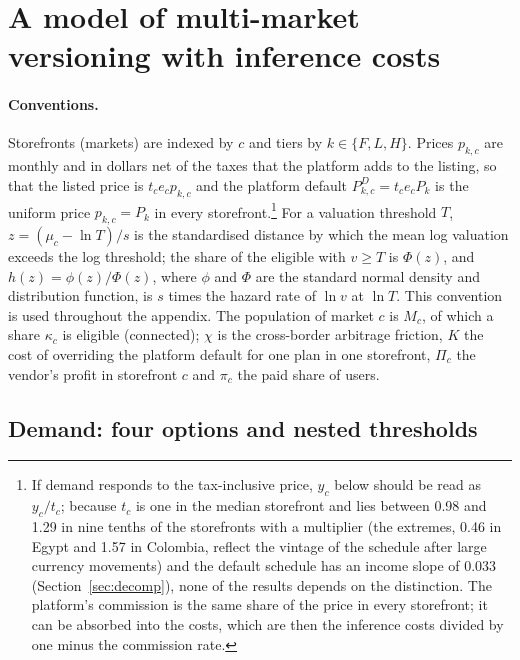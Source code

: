 \documentclass[11pt]{article}
\theoremstyle{definition}
\theoremstyle{remark}
\begin{document}
\section{A model of multi-market versioning with inference costs}\label{app:tiermodel}
\label{sec:conditional_access}

\paragraph{Conventions.} Storefronts (markets) are indexed by $c$ and tiers by $k\in\{F,L,H\}$. Prices $p_{k,c}$ are monthly and in dollars net of the taxes that the platform adds to the listing, so that the listed price is $t_ce_cp_{k,c}$ and the platform default $P^D_{k,c}=t_ce_cP_k$ is the uniform price $p_{k,c}=P_k$ in every storefront.\footnote{If demand responds to the tax-inclusive price, $y_c$ below should be read as $y_c/t_c$; because $t_c$ is one in the median storefront and lies between 0.98 and 1.29 in nine tenths of the storefronts with a multiplier (the extremes, 0.46 in Egypt and 1.57 in Colombia, reflect the vintage of the schedule after large currency movements) and the default schedule has an income slope of 0.033 (Section~\ref{sec:decomp}), none of the results depends on the distinction. The platform's commission is the same share of the price in every storefront; it can be absorbed into the costs, which are then the inference costs divided by one minus the commission rate.} For a valuation threshold $T$, $z=(\mu_c-\ln T)/s$ is the standardised distance by which the mean log valuation exceeds the log threshold; the share of the eligible with $v\ge T$ is $\Phi(z)$, and $h(z)=\phi(z)/\Phi(z)$, where $\phi$ and $\Phi$ are the standard normal density and distribution function, is $s$ times the hazard rate of $\ln v$ at $\ln T$. This convention is used throughout the appendix. The population of market $c$ is $M_c$, of which a share $\kappa_c$ is eligible (connected); $\chi$ is the cross-border arbitrage friction, $K$ the cost of overriding the platform default for one plan in one storefront, $\Pi_c$ the vendor's profit in storefront $c$ and $\pi_c$ the paid share of users.

\subsection{Demand: four options and nested thresholds}\label{app:demand}
\end{document}
